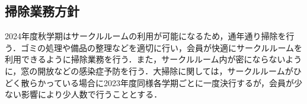 \subsection*{掃除業務方針}


2024年度秋学期はサークルルームの利用が可能になるため，通年通り掃除を行う．ゴミの処理や備品の整理などを適切に行い，会員が快適にサークルルームを利用できるように掃除業務を行う．また，サークルルーム内が密にならないように，窓の開放などの感染症予防を行う．大掃除に関しては，サークルルームがひどく散らかっている場合に2023年度同様各学期ごとに一度決行するが，会員が少ない影響により少人数で行うこととする．